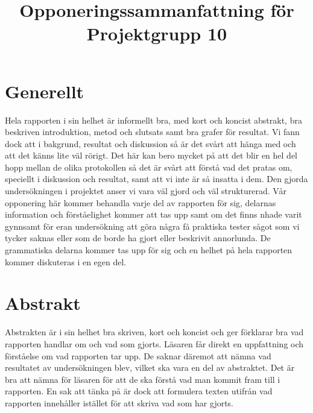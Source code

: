 \documentclass{article}
\begin{document}
\title{Opponeringssammanfattning för Projektgrupp 10}

\maketitle

\section{Generellt}
Hela rapporten i sin helhet är informellt bra, med kort och koncist abstrakt, bra beskriven introduktion, metod och slutsats samt bra grafer för resultat. Vi fann dock att i bakgrund, resultat och diskussion så är det svårt att hänga med och att det känns lite väl rörigt. Det här kan bero mycket på att det blir en hel del hopp mellan de olika protokollen så det är svårt att förstå vad det pratas om, speciellt i diskussion och resultat, samt att vi inte är så insatta i dem. Den gjorda undersökningen i projektet anser vi vara väl gjord och väl strukturerad.
Vår opponering här kommer behandla varje del av rapporten för sig, delarnas information och förståelighet kommer att tas upp samt om det finns nhade varit gynnsamt för eran undersökning att göra några få praktiska tester sågot som vi tycker saknas eller som de borde ha gjort eller beskrivit annorlunda. De grammatiska delarna kommer tas upp för sig och en helhet på hela rapporten kommer diskuteras i en egen del.

\section{Abstrakt}
Abstrakten är i sin helhet bra skriven, kort och koncist och ger förklarar bra vad rapporten handlar om och vad som gjorts. Läsaren får direkt en uppfattning och förståelse om vad rapporten tar upp. De saknar däremot att nämna vad resultatet av undersökningen blev, vilket ska vara en del av abstraktet. Det är bra att nämna för läsaren för att de ska förstå vad man kommit fram till i rapporten. En sak att tänka på är dock att formulera texten utifrån vad rapporten innehåller istället för att skriva vad som har gjorts.
\end{document}
